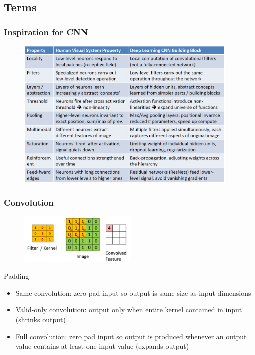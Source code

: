 \documentclass{ctexbeamer}
\begin{document}
\subsection{Terms}
\begin{frame}
  \frametitle{Inspiration for CNN}
  \begin{figure}[H]
    \centering
    \includegraphics[width=0.95\textwidth]{./figures/cnn_brain.png}
  \end{figure}
\end{frame}

\begin{frame}
  \frametitle{Convolution}
  \begin{figure}[H]
    \centering
    \includegraphics[width=0.5\textwidth]{./figures/convolution.png}
    \label{fig:convolution}
  \end{figure}
  \begin{block}{Padding}
    \begin{itemize}
      \item Same convolution: zero pad input so output is same size as input dimensions
      \item Valid-only convolution: output only when entire kernel contained in input (shrinks output)
      \item Full convolution: zero pad input so output is produced whenever an output value contains at least one input value (expands output)
    \end{itemize}
  \end{block}
\end{frame}
\end{document}
